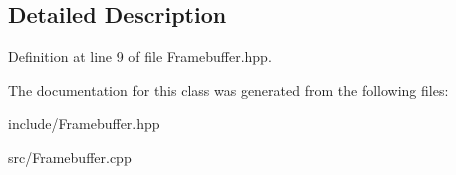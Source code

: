 \subsection{Detailed Description}


Definition at line 9 of file Framebuffer.\+hpp.



The documentation for this class was generated from the following files\+:\begin{DoxyCompactItemize}
\item 
include/Framebuffer.\+hpp\item 
src/Framebuffer.\+cpp\end{DoxyCompactItemize}
